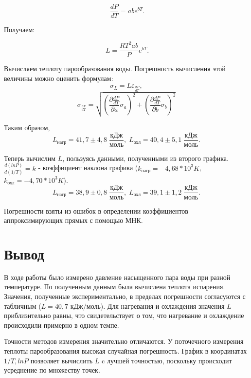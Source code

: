 \documentclass[a4paper,12pt]{article} %
\begin{document}
\begin{equation}\
\frac{dP}{dT} = abe^{bT}.
\end{equation}

\noindent Получаем:

\begin{equation}\
L=\frac{RT^2ab}{P}e^{bT}.
\end{equation}

\noindent Вычисляем теплоту парообразования воды. Погрешность вычисления этой величины можно оценить формулам:
\[ \sigma_L = L\varepsilon_{\frac{dP}{dT}}, \]
\[ \sigma_{\frac{dP}{dT}} = \sqrt{\left(\frac{\partial\frac{dP}{dT}}{\partial a}\sigma_a\right)^2+\left(\frac{\partial\frac{dP}{dT}}{\partial b}\sigma_b\right)^2} \]


\medskip
\medskip

\noindent Таким образом, $$L_\text{нагр} = 41,7 \pm 4,8 \; \frac{\text{кДж}}{\text{моль}}, \; L_\text{охл} = 40,4 \pm 5,1 \; \frac{\text{кДж}}{\text{моль}}.$$ 

\medskip






\noindent Теперь вычислим $L$, пользуясь данными, полученными  из второго графика.
$\frac{d(lnP)}{d(1/T)} = k$ - коэффициент наклона графика ($k_\text{нагр} = -4,68 *10^3 K$, $k_\text{охл} = -4,70 *10^3 K$). $$L_\text{нагр} = 38,9 \pm 0,8 \; \frac{\text{кДж}}{\text{моль}}, \; L_\text{охл} = 39,1 \pm 1,2 \; \frac{\text{кДж}}{\text{моль}}.$$ 

\medskip

\noindent Погрешности взяты из ошибок в определении коэффициентов аппроксимирующих прямых с помощью МНК.

\medskip

\section{Вывод}

\medskip

\noindent В ходе работы было измерено давление насыщенного пара воды при разной температуре. По полученным данным была вычислена теплота испарения. Значения, полученные экспериментально, в пределах погрешности согласуются с табличным ($L = 40,7 \text{ кДж/моль}$). Для нагревания и охлаждения значения $L$ приблизительно равны, что свидетельствует о том, что нагревание и охлаждение происходили примерно в одном темпе.

\medskip

\noindent Точности методов измерения значительно отличаются. У поточечного измерения теплоты парообразования высокая случайная погрешность. График в координатах $1/T, lnP$ позволяет вычислить $L$ c лучшей точностью, поскольку происходит усреднение по множеству точек. 

\medskip

	
\end{document}
